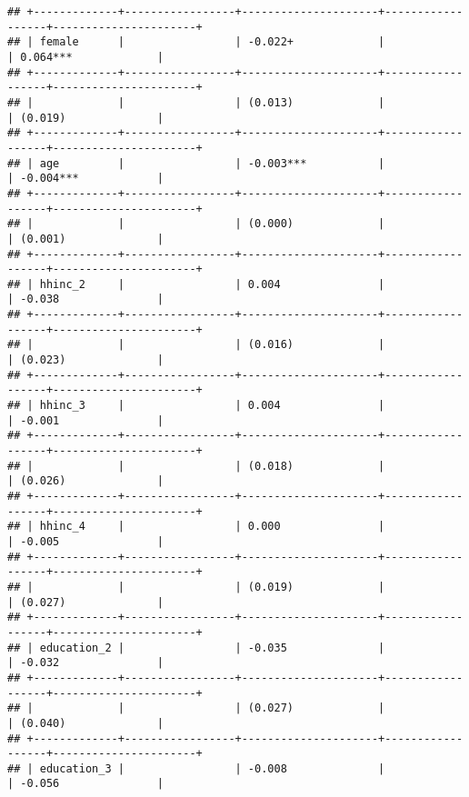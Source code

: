 \begin{verbatim}
## +-------------+-----------------+---------------------+------------------+----------------------+
## | female      |                 | -0.022+             |                  | 0.064***             |
## +-------------+-----------------+---------------------+------------------+----------------------+
## |             |                 | (0.013)             |                  | (0.019)              |
## +-------------+-----------------+---------------------+------------------+----------------------+
## | age         |                 | -0.003***           |                  | -0.004***            |
## +-------------+-----------------+---------------------+------------------+----------------------+
## |             |                 | (0.000)             |                  | (0.001)              |
## +-------------+-----------------+---------------------+------------------+----------------------+
## | hhinc_2     |                 | 0.004               |                  | -0.038               |
## +-------------+-----------------+---------------------+------------------+----------------------+
## |             |                 | (0.016)             |                  | (0.023)              |
## +-------------+-----------------+---------------------+------------------+----------------------+
## | hhinc_3     |                 | 0.004               |                  | -0.001               |
## +-------------+-----------------+---------------------+------------------+----------------------+
## |             |                 | (0.018)             |                  | (0.026)              |
## +-------------+-----------------+---------------------+------------------+----------------------+
## | hhinc_4     |                 | 0.000               |                  | -0.005               |
## +-------------+-----------------+---------------------+------------------+----------------------+
## |             |                 | (0.019)             |                  | (0.027)              |
## +-------------+-----------------+---------------------+------------------+----------------------+
## | education_2 |                 | -0.035              |                  | -0.032               |
## +-------------+-----------------+---------------------+------------------+----------------------+
## |             |                 | (0.027)             |                  | (0.040)              |
## +-------------+-----------------+---------------------+------------------+----------------------+
## | education_3 |                 | -0.008              |                  | -0.056               |

\end{verbatim}
